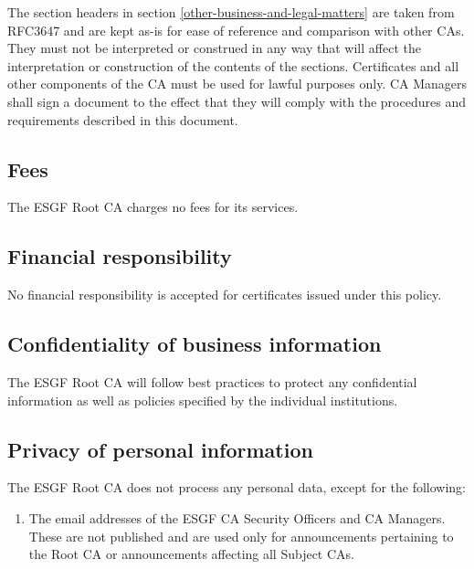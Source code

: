 The section headers in section \ref{other-business-and-legal-matters} are taken from RFC3647 and are kept
as-is for ease of reference and comparison with other CAs. They must not
be interpreted or construed in any way that will affect the
interpretation or construction of the contents of the sections.
Certificates and all other components of the CA must be used for lawful
purposes only. CA Managers shall sign a document to the effect that they
will comply with the procedures and requirements described in this
document.

\subsection{Fees}\label{fees}

The ESGF Root CA charges no fees for its services.

\subsection{Financial responsibility}\label{financial-responsibility}

No financial responsibility is accepted for certificates issued under
this policy.

\subsection{Confidentiality of business information}\label{confidentiality-of-business-information}

The ESGF Root CA will follow best practices to protect any
confidential information as well as policies specified by the individual institutions.

\subsection{Privacy of personal information}\label{privacy-of-personal-information}

The ESGF Root CA does not process any personal data, except for the
following:

\begin{enumerate}
\item
  
  The email addresses of the ESGF CA Security Officers and CA Managers.
  These are not published and are used only for announcements pertaining
  to the Root CA or announcements affecting all Subject CAs.
  
\end{enumerate}

